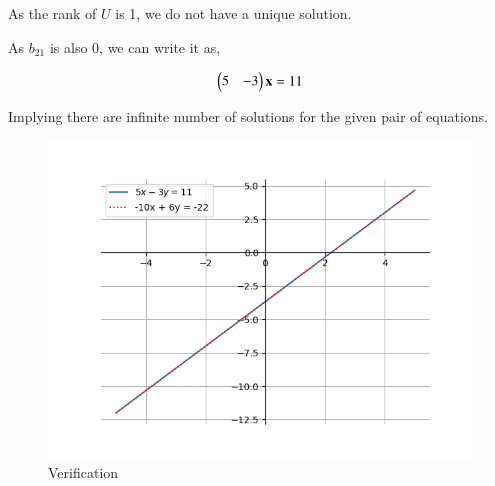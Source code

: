 \documentclass[journal]{IEEEtran}
\begin{document}
    As the rank of $U$ is 1, we do not have a unique solution.
    
    As $b_{21}$ is also 0, we can write it as,

    \begin{align}
        \begin{pmatrix}5 & -3\end{pmatrix}\mathbf{x} = 11
    \end{align}

    Implying there are infinite number of solutions for the given pair of equations.

    \begin{figure}[ht]  
        \centering  
        \includegraphics[width=\columnwidth]{figs/fig1.png}  
        \caption{Verification}
    \end{figure}
\end{document}
